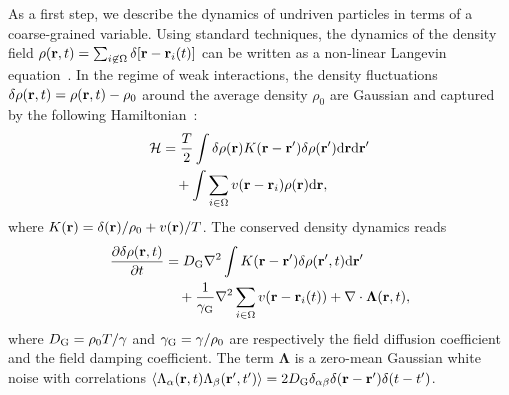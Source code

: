 \documentclass[superscriptaddress, twocolumn, prx, longbibliography, nofootinbib]{revtex4-1}
\newcommand{\dd}{\text{d}}
\begin{document}
As a first step, we describe the dynamics of undriven particles in terms of a coarse-grained variable. Using standard techniques, the dynamics of the density field $\rho({\bf r},t) = \sum_{i\not\in\Omega}\delta[{\bf r}-{\bf r}_i(t)]$ can be written as a non-linear Langevin equation~\cite{Dean1996}. In the regime of weak interactions, the density fluctuations $\delta \rho({\bf r},t ) = \rho({\bf r}, t) - \rho_0$ around the average density $\rho_0$ are Gaussian and captured by the following Hamiltonian~\cite{Chandler1993, Demery2014, Kruger2017}:
\begin{equation}
	\begin{aligned}
		{\cal H} &= \frac{T}{2} \int \delta \rho ({\bf r}) K({\bf r} - {\bf r}') \delta \rho ({\bf r}') \dd{\bf r}\dd{\bf r}'
		\\
		&\quad + \int \sum_{i\in\Omega} v({\bf r}-{\bf r}_i) \rho({\bf r}) \dd{\bf r} ,
	\end{aligned}
\end{equation}
where $K({\bf r})= \delta({\bf r})/\rho_0 + v({\bf r})/T$. The conserved density dynamics reads
\begin{equation}\label{eq:EvolutionField}
	\begin{aligned}
		\frac{\partial \delta \rho({\bf r}, t)}{\partial t} &= D_{\rm G} \nabla^2 \int K({\bf r}-{\bf r}') \delta \rho({\bf r}', t) \dd{\bf r}'
		\\
		&\quad + \frac{1}{\gamma_{\rm G}} \nabla^2 \sum_{i\in\Omega}v({\bf r}-{\bf r}_i(t)) + \nabla \cdot {\boldsymbol\Lambda}({\bf r},t) ,
	\end{aligned}
\end{equation}
where $D_{\rm G} = \rho_0 T/\gamma$ and $\gamma_{\rm G}=\gamma/\rho_0$ are respectively the field diffusion coefficient and the field damping coefficient. The term $\boldsymbol\Lambda$ is a zero-mean Gaussian white noise with correlations $\langle \Lambda_\alpha({\bf r}, t) \Lambda_\beta({\bf r}', t') \rangle = 2 D_{\rm G} \delta_{\alpha\beta}\delta({\bf r} - {\bf r}')\delta(t-t')$.
\end{document}
